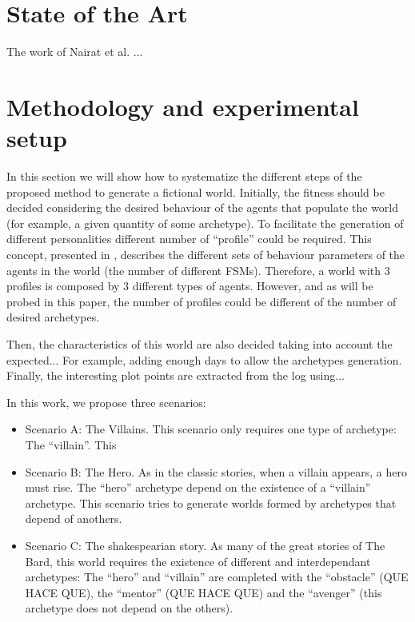 \documentclass[runningheads,a4paper]{llncs}
\begin{document}
\section{State of the Art}

The work of Nairat et al. \cite{nairat:evolution} ...

\section{Methodology and experimental setup} %
\label{sec:met}

In this section we will show how to systematize the different steps of the proposed method to generate a fictional world. Initially, the fitness should be decided considering the desired behaviour of the agents that populate the world (for example, a given quantity of some archetype). To facilitate the generation of different personalities different number of ``profile'' could be required. This concept, presented in \cite{}, describes the different sets of behaviour parameters of the agents in the world (the number of different FSMs). Therefore, a world with 3 profiles is composed by 3 different types of agents. However, and as will be probed in this paper, the number of profiles could be different of the number of desired archetypes.

Then, the characteristics of this world are also decided taking into account the expected... For example, adding enough days to allow the archetypes generation. Finally, the interesting plot points are extracted from the log using... 



In this work, we propose three scenarios:
\begin{itemize}
\item Scenario A: The Villains. This scenario only requires one type of archetype: The ``villain''. This 
\item Scenario B: The Hero. As in the classic stories, when a villain appears, a hero must rise. The ``hero'' archetype depend on the existence of a ``villain'' archetype. This scenario tries to generate worlds formed by archetypes that depend of anothers.
\item Scenario C: The shakespearian story. As many of the great stories of The Bard, this world requires the existence of different and interdependant archetypes: The ``hero'' and ``villain'' are completed with the ``obstacle'' (QUE HACE QUE), the  ``mentor'' (QUE HACE QUE) and the ``avenger'' (this archetype does not depend on the others).
\end{itemize}
\end{document}
